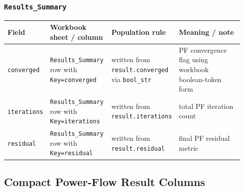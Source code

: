 \subsubsection*{\texttt{Results\_Summary}}

\begin{longtable}{@{}L{0.18\linewidth}L{0.26\linewidth}L{0.22\linewidth}L{0.28\linewidth}@{}}
\toprule
Field & Workbook sheet / column & Population rule & Meaning / note \\
\midrule
\endhead
\texttt{converged} & \texttt{Results\_Summary} row with \texttt{Key=converged} & written from \texttt{result.converged} via \texttt{bool\_str} & PF convergence flag using workbook boolean-token form \\
\texttt{iterations} & \texttt{Results\_Summary} row with \texttt{Key=iterations} & written from \texttt{result.iterations} & total PF iteration count \\
\texttt{residual} & \texttt{Results\_Summary} row with \texttt{Key=residual} & written from \texttt{result.residual} & final PF residual metric \\
\bottomrule
\end{longtable}

\subsection{Compact Power-Flow Result Columns}

